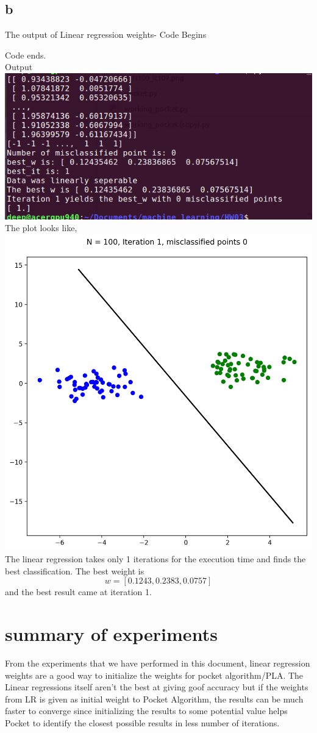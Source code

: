 \documentclass[10pt]{article}         %
\begin{document}
\subsection{b}
The output of Linear regression weights-
Code Begins

Code ends. 
\\Output\\
\includegraphics[scale=0.45]{Blob_LR1}
\\The plot looks like, 
\\
\includegraphics[scale=0.45]{Blob_LR_N100_it1}
\\The linear regression takes only 1 iterations for the execution time and finds the best classification. The best weight is $$w = [0.1243,  0.2383, 0.0757]$$ and the best result came at iteration 1.

\section{summary of experiments}
From the experiments that we have performed in this document, linear regression weights are a good way to initialize the weights for pocket algorithm/PLA. The Linear regressions itself aren't the best at giving goof accuracy but if the weights from LR is given as initial weight to Pocket Algorithm, the results can be much faster to converge since initializing the results to some potential value helps Pocket to identify the closest possible results in less number of iterations.
\end{document}
